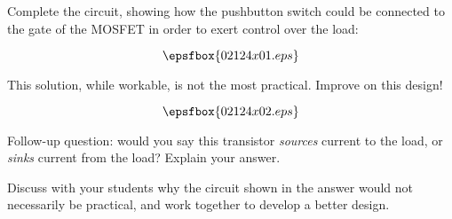

Complete the circuit, showing how the pushbutton switch could be connected to the gate of the MOSFET in order to exert control over the load:

$$\epsfbox{02124x01.eps}$$







This solution, while workable, is not the most practical.  Improve on this design!

$$\epsfbox{02124x02.eps}$$

Follow-up question: would you say this transistor {\it sources} current to the load, or {\it sinks} current from the load?  Explain your answer.







Discuss with your students why the circuit shown in the answer would not necessarily be practical, and work together to develop a better design.




